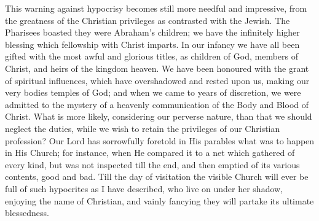 This warning against hypocrisy becomes still more
needful and impressive, from the greatness of the
Christian privileges as contrasted with the Jewish. The
Pharisees boasted they were Abraham's children; we have
the infinitely higher blessing which fellowship with
Christ imparts. In our infancy we have all been gifted
with the most awful and glorious titles, as children of God, members of Christ, and heirs of the kingdom heaven.
We have been honoured with the grant of spiritual
influences, which have overshadowed and rested upon us,
making our very bodies temples of God; and when we came
to years of discretion, we were admitted to the mystery
of a heavenly communication of the Body and Blood of
Christ. What is more likely, considering our perverse
nature, than that we should neglect the duties, while we
wish to retain the privileges of our Christian
profession? Our Lord has sorrowfully foretold in His
parables what was to happen in His Church; for instance,
when He compared it to a net which gathered of every
kind, but was not inspected till the end, and then
emptied of its various contents, good and bad. Till the
day of visitation the visible Church will ever be full of
such hypocrites as I have described, who live on under
her shadow, enjoying the name of Christian, and vainly
fancying they will partake its ultimate blessedness.

